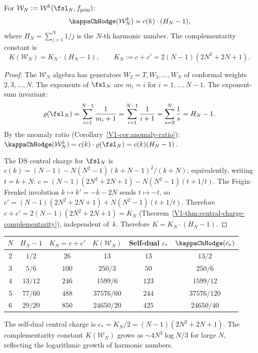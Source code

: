 \begin{theorem}
For $\mathcal{W}_N := \mathcal{W}^k(\fsl_N, f_{\mathrm{prin}})$:
\begin{equation}%
\kappaChHodge(\mathcal{W}_N^k) = c(k) \cdot (H_N - 1),
\end{equation}
where $H_N = \sum_{j=1}^N 1/j$ is the $N$-th harmonic number. The complementarity constant is
\begin{equation}%
K(\mathcal{W}_N) = K_N \cdot (H_N - 1),
\qquad K_N := c + c' = 2(N{-}1)(2N^2{+}2N{+}1).
\end{equation}
\end{theorem}

\begin{proof}
The $\mathcal{W}_N$ algebra has generators $W_2 = T, W_3, \ldots, W_N$
of conformal weights $2, 3, \ldots, N$. The exponents of $\fsl_N$ are
$m_i = i$ for $i = 1, \ldots, N-1$. The exponent-sum invariant:
\[
\varrho(\fsl_N)
= \sum_{i=1}^{N-1} \frac{1}{m_i + 1}
= \sum_{i=1}^{N-1} \frac{1}{i+1}
= \sum_{s=2}^N \frac{1}{s}
= H_N - 1.
\]
By the anomaly ratio (Corollary~\ref{V1-cor:anomaly-ratio}):
$\kappaChHodge(\mathcal{W}_N^k) = c(k) \cdot \varrho(\fsl_N) = c(k)(H_N - 1)$.

The DS central charge for $\fsl_N$ is
$c(k) = (N-1) - N(N^2-1)(k+N-1)^2/(k+N)$;
equivalently, writing $t = k+N$: $c = (N-1)(2N^2+2N+1) - N(N^2-1)(t + 1/t)$.
The Feigin--Frenkel involution $k \mapsto k' = -k - 2N$ sends $t \mapsto -t$,
so $c' = (N-1)(2N^2+2N+1) + N(N^2-1)(t + 1/t)$. Therefore
$c + c' = 2(N-1)(2N^2+2N+1) = K_N$
(Theorem~\ref{V1-thm:central-charge-complementarity}),
independent of~$k$.
Therefore $K = K_N \cdot (H_N - 1)$.
\end{proof}

\begin{computation}
\renewcommand{\arraystretch}{1.4}
\begin{center}
\begin{tabular}{cccccc}
\toprule
$N$ & $H_N - 1$ & $K_N = c + c'$ & $K(\mathcal{W}_N)$ &
Self-dual $c_*$ & $\kappaChHodge(c_*)$ \\
\midrule
$2$ & $1/2$ & $26$ & $13$ & $13$ & $13/2$ \\[4pt]
$3$ & $5/6$ & $100$ & $250/3$ & $50$ & $250/6$ \\[4pt]
$4$ & $13/12$ & $246$ & $1599/6$ & $123$ & $1599/12$ \\[4pt]
$5$ & $77/60$ & $488$ & $37576/60$ & $244$ & $37576/120$ \\[4pt]
$6$ & $29/20$ & $850$ & $24650/20$ & $425$ & $24650/40$ \\
\bottomrule
\end{tabular}
\end{center}
The self-dual central charge is $c_* = K_N/2 = (N-1)(2N^2+2N+1)$.
The complementarity constant $K(\mathcal{W}_N)$ grows as
$\sim 4N^3 \log N / 3$ for large $N$, reflecting the logarithmic
growth of harmonic numbers.
\end{computation}

